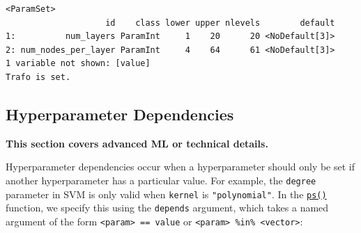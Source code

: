 \begin{verbatim}
<ParamSet>
                    id    class lower upper nlevels        default
1:          num_layers ParamInt     1    20      20 <NoDefault[3]>
2: num_nodes_per_layer ParamInt     4    64      61 <NoDefault[3]>
1 variable not shown: [value]
Trafo is set.
\end{verbatim}

\hypertarget{sec-optimization-depends}{%
\subsection{Hyperparameter
Dependencies}\label{sec-optimization-depends}}

\begin{tcolorbox}[enhanced jigsaw, colframe=quarto-callout-note-color-frame, rightrule=.15mm, bottomrule=.15mm, toprule=.15mm, opacityback=0, colback=white, left=2mm, arc=.35mm, breakable, leftrule=.75mm]
\begin{minipage}[t]{5.5mm}
\textcolor{quarto-callout-note-color}{\faInfo}
\end{minipage}%
\begin{minipage}[t]{\textwidth - 5.5mm}

\textbf{This section covers advanced ML or technical
details.}\vspace{2mm}

\end{minipage}%
\end{tcolorbox}

Hyperparameter dependencies occur when a hyperparameter should only be
set if another hyperparameter has a particular value. For example, the
\texttt{degree} parameter in SVM is only valid when \texttt{kernel} is
\texttt{"polynomial"}. In the
\href{https://paradox.mlr-org.com/reference/ps.html}{\texttt{ps()}}
function, we specify this using the \texttt{depends} argument, which
takes a named argument of the form
\texttt{\textless{}param\textgreater{}\ ==\ value} or
\texttt{\textless{}param\textgreater{}\ \%in\%\ \textless{}vector\textgreater{}}:

\begin{Shaded}
\begin{Highlighting}[]
\NormalTok{(}
   \NormalTok{(}\NormalTok{(}\NormalTok{, }\NormalTok{)),}
   \NormalTok{(}\NormalTok{, }\NormalTok{, }\SpecialCharTok{==} \NormalTok{)),}
   \NormalTok{(}\NormalTok{, }\NormalTok{,}
     \NormalTok{(}\NormalTok{, }\NormalTok{)))}
\NormalTok{)}
\end{Highlighting}
\end{Shaded}

